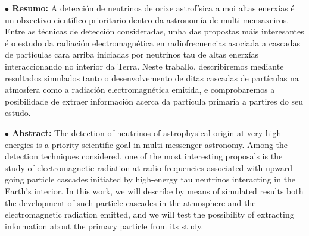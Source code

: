 \documentclass[11 pt, a4paper]{article} %
\numberwithin{equation}{section}
\numberwithin{figure}{section}
\numberwithin{table}{section}
\begin{document}
	\begin{flushleft}  {\bf $\bullet$ Resumo:\;\;}
		A detección de neutrinos de orixe astrofísica a moi altas enerxías é un obxectivo científico prioritario dentro da astronomía de multi-mensaxeiros. Entre as técnicas de detección consideradas, unha das propostas máis interesantes é o estudo da radiación electromagnética en radiofrecuencias asociada a cascadas de partículas cara arriba iniciadas por neutrinos tau de altas enerxías interaccionando no interior da Terra. Neste traballo, describiremos mediante resultados simulados tanto o desenvolvemento de ditas cascadas de partículas na atmosfera como a radiación electromagnética emitida, e comprobaremos a posibilidade de extraer información acerca da partícula primaria a partires do seu estudo.
	\end{flushleft}\mbox{}
	
	
	\begin{flushleft}  {\bf $\bullet$ Abstract:\;\;}
		The detection of neutrinos of astrophysical origin at very high energies is a priority scientific goal in multi-messenger astronomy. Among the detection techniques considered, one of the most interesting proposals is the study of electromagnetic radiation at radio frequencies associated with upward-going particle cascades initiated by high-energy tau neutrinos interacting in the Earth's interior. In this work, we will describe by means of simulated results both the development of such particle cascades in the atmosphere and the electromagnetic radiation emitted, and we will test the possibility of extracting information about the primary particle from its study.
	\end{flushleft}\mbox{}
	
	\clearpage
	\pagestyle{fancy}
	\fancyhead{}
	\lhead{}
	\rhead{}
	\chead{}
	\renewcommand{\headrulewidth}{0.1pt}
	\lfoot{} 
	\cfoot{\thepage}
	\rfoot{} 
	\renewcommand{\footrulewidth}{0pt}
	
	\setcounter{page}{1}
	\tableofcontents
	\clearpage
	
\end{document}
